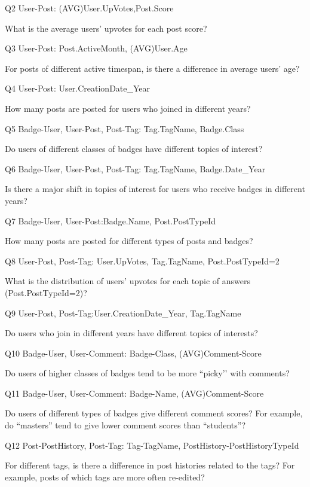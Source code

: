 \documentclass[letterpaper,12pt,titlepage,oneside,final]{book}
\begin{document}
Q2 \hspace{3mm} User-Post: (AVG)User.UpVotes,Post.Score

What is the average users' upvotes for each post score?

Q3 \hspace{3mm} User-Post: Post.ActiveMonth, (AVG)User.Age

For posts of different active timespan, is there a difference in average users' age?

Q4 \hspace{3mm} User-Post: User.CreationDate\_Year

How many posts are posted for users who joined in different years?

Q5 \hspace{3mm} Badge-User, User-Post, Post-Tag: Tag.TagName, Badge.Class

Do users of different classes of badges have different topics of interest?

Q6 \hspace{3mm} Badge-User, User-Post, Post-Tag: Tag.TagName, Badge.Date\_Year

Is there a major shift in topics of interest for users who receive badges in different years?

Q7 \hspace{3mm} Badge-User, User-Post:Badge.Name, Post.PostTypeId

How many posts are posted for different types of posts and badges?

Q8 \hspace{3mm} User-Post, Post-Tag: User.UpVotes, Tag.TagName, Post.PostTypeId=2

What is the distribution of users' upvotes for each topic of answers (Post.PostTypeId=2)?

Q9 \hspace{3mm} User-Post, Post-Tag:User.CreationDate\_Year, Tag.TagName

Do users who join in different years have different topics of interests?

Q10 \hspace{1.3mm} Badge-User, User-Comment: Badge-Class, (AVG)Comment-Score

Do users of higher classes of badges tend to be more ``picky’’ with comments?

Q11 \hspace{1.3mm} Badge-User, User-Comment: Badge-Name, (AVG)Comment-Score

Do users of different types of badges give different comment scores? For example, do ``masters'' tend to give lower comment scores than ``students''?

Q12 \hspace{1.3mm} Post-PostHistory, Post-Tag: Tag-TagName, PostHistory-PostHistoryTypeId

For different tags, is there a difference in post histories related to the tags? For example, posts of which tags are more often re-edited?
\end{document}
